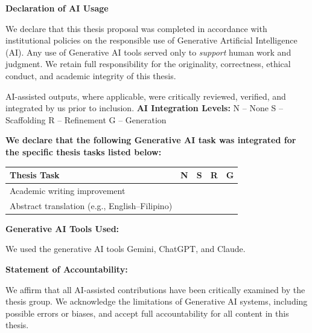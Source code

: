 


\newcommand{\yes}{\ding{51}}


\clearpage
\thispagestyle{empty}    
\begin{center}
    {\Large \textbf{Declaration of AI Usage}}\\[1.5em]
\end{center}

\noindent
We declare that this thesis proposal was completed in accordance with institutional policies on the responsible use of Generative Artificial Intelligence (AI). Any use of Generative AI tools served only to \emph{support} human work and judgment. We retain full responsibility for the originality, correctness, ethical conduct, and academic integrity of this thesis.

\noindent
AI-assisted outputs, where applicable, were critically reviewed, verified, and integrated by us prior to inclusion.
\textbf{AI Integration Levels:}
N – None \quad
S – Scaffolding \quad
R – Refinement \quad
G – Generation

\medskip
\noindent
\textbf{We declare that the following Generative AI task was integrated for the specific thesis tasks listed below:}

\renewcommand{\arraystretch}{1.15}
\begin{tabular}{p{} | c | c | c | c}
\toprule
\textbf{Thesis Task} & \textbf{N} & \textbf{S} & \textbf{R} & \textbf{G} \\ \midrule
Academic writing improvement &  & \yes  &  &  \\ \hline
Abstract translation (e.g., English--Filipino) &  &  &  & \yes \\ \hline
\end{tabular}

\noindent
\textbf{Generative AI Tools Used:}  
\par We used the generative AI tools Gemini, ChatGPT, and Claude.

\medskip
\noindent
\textbf{Statement of Accountability:}

\noindent
We affirm that all AI-assisted contributions have been critically examined by the thesis group. We acknowledge the limitations of Generative AI systems, including possible errors or biases, and accept full accountability for all content in this thesis.

\clearpage